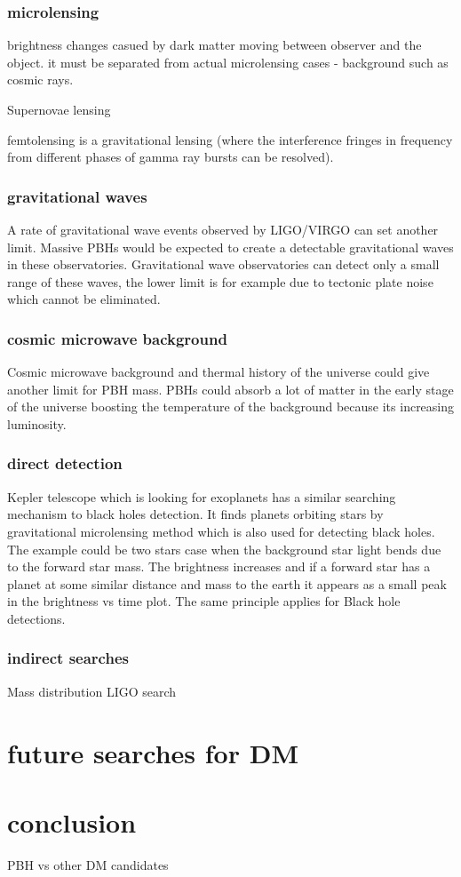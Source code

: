 ﻿\documentclass{article}
\begin{document}
\subsubsection {microlensing}
brightness changes casued by dark matter moving between observer and the object. \cite{GRIEST_1993_microlensing} 
it must be separated from actual microlensing cases - background such as cosmic rays. 

Supernovae lensing 

femtolensing is a gravitational lensing (where the interference fringes in frequency from different phases of gamma ray bursts can be resolved). \cite{Katz_2018}

\subsubsection {gravitational waves}
A rate of gravitational wave events observed by LIGO/VIRGO can set another limit. Massive PBHs would be expected to create a detectable gravitational waves in these observatories.  \cite{PBH_as_DM_candidate}
Gravitational wave observatories can detect only a small range of these waves, the lower limit is for example due to tectonic plate noise which cannot be eliminated. 




\subsubsection {cosmic microwave background}
Cosmic microwave background and thermal history of the universe could give another limit for PBH mass. PBHs could absorb a lot of matter in the early stage of the universe boosting the temperature of the background because its increasing luminosity.  \cite{PBH_as_DM_candidate}

\subsubsection{direct detection}
Kepler telescope which is looking for exoplanets has a similar searching mechanism to black holes detection. It finds planets orbiting stars by gravitational microlensing method which is also used for detecting black holes. The example could be two stars case when the background star light bends due to the forward star mass. The brightness increases and if a forward star has a planet at some similar distance and mass to the earth it appears as a small peak in the brightness vs time plot. The same principle applies for Black hole detections. 

\subsubsection {indirect searches}
Mass distribution LIGO search 

\section {future searches for DM}

\section {conclusion}
PBH vs other DM candidates 









\raggedright


\end{document}
